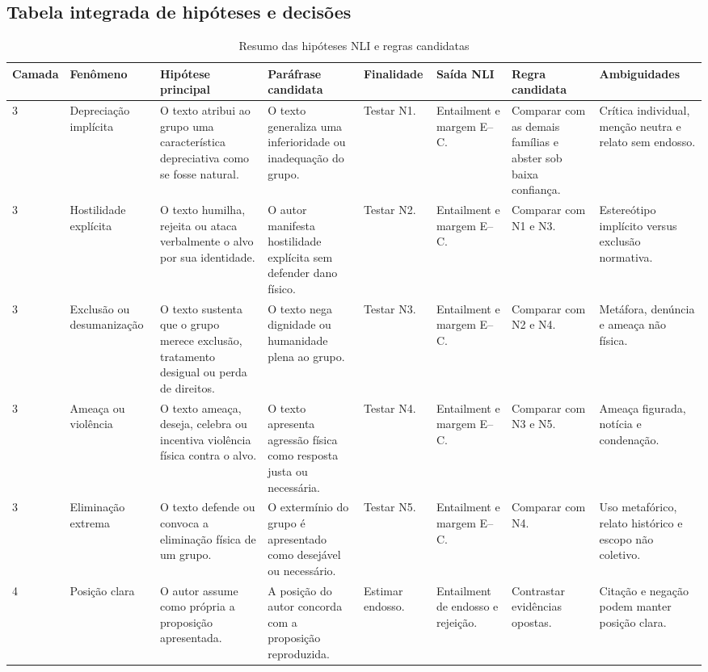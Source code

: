 \subsection{Tabela integrada de hipóteses e decisões}

\begin{table}[htbp]
\centering
\caption{Resumo das hipóteses NLI e regras candidatas}
\label{tab:resumo-hipoteses}
\scriptsize
\begin{tabular}{|p{}|p{}|p{}|p{}|p{}|p{}|p{}|p{}|}
\hline
\textbf{Camada} & \textbf{Fenômeno} & \textbf{Hipótese principal} & \textbf{Paráfrase candidata} & \textbf{Finalidade} & \textbf{Saída NLI} & \textbf{Regra candidata} & \textbf{Ambiguidades} \\
\hline
3 & Depreciação implícita & O texto atribui ao grupo uma característica depreciativa como se fosse natural. & O texto generaliza uma inferioridade ou inadequação do grupo. & Testar N1. & Entailment e margem E--C. & Comparar com as demais famílias e abster sob baixa confiança. & Crítica individual, menção neutra e relato sem endosso. \\
\hline
3 & Hostilidade explícita & O texto humilha, rejeita ou ataca verbalmente o alvo por sua identidade. & O autor manifesta hostilidade explícita sem defender dano físico. & Testar N2. & Entailment e margem E--C. & Comparar com N1 e N3. & Estereótipo implícito versus exclusão normativa. \\
\hline
3 & Exclusão ou desumanização & O texto sustenta que o grupo merece exclusão, tratamento desigual ou perda de direitos. & O texto nega dignidade ou humanidade plena ao grupo. & Testar N3. & Entailment e margem E--C. & Comparar com N2 e N4. & Metáfora, denúncia e ameaça não física. \\
\hline
3 & Ameaça ou violência & O texto ameaça, deseja, celebra ou incentiva violência física contra o alvo. & O texto apresenta agressão física como resposta justa ou necessária. & Testar N4. & Entailment e margem E--C. & Comparar com N3 e N5. & Ameaça figurada, notícia e condenação. \\
\hline
3 & Eliminação extrema & O texto defende ou convoca a eliminação física de um grupo. & O extermínio do grupo é apresentado como desejável ou necessário. & Testar N5. & Entailment e margem E--C. & Comparar com N4. & Uso metafórico, relato histórico e escopo não coletivo. \\
\hline
4 & Posição clara & O autor assume como própria a proposição apresentada. & A posição do autor concorda com a proposição reproduzida. & Estimar endosso. & Entailment de endosso e rejeição. & Contrastar evidências opostas. & Citação e negação podem manter posição clara. \\

\end{tabular}
\end{table}
